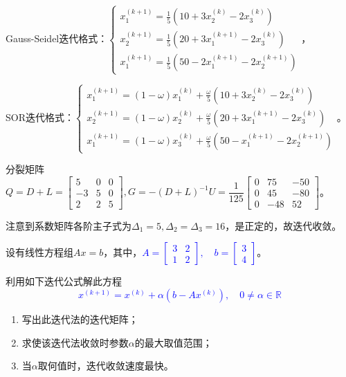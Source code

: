     \begin{solution}
        Gauss-Seidel迭代格式：$\begin{cases}x_1^{(k+1)}=\frac15(10+3x_2^{(k)}-2x_3^{(k)})\\x_2^{(k+1)}=\frac15(20+3x_1^{(k+1)}-2x_3^{(k)})\\x_1^{(k+1)}=\frac15(50-2x_1^{(k+1)}-2x_2^{(k+1)})\end{cases}$，

        SOR迭代格式：$\begin{cases}x_1^{(k+1)}=(1-\omega)x_1^{(k)}+\frac{\omega}5(10+3x_2^{(k)}-2x_3^{(k)})\\x_2^{(k+1)}=(1-\omega)x_2^{(k)}+\frac{\omega}5(20+3x_1^{(k+1)}-2x_3^{(k)})\\x_1^{(k+1)}=(1-\omega)x_3^{(k)}+\frac{\omega}5(50-x_1^{(k+1)}-2x_2^{(k+1)})\end{cases}$。

        分裂矩阵$Q=D+L=\begin{bmatrix}5&0&0\\-3&5&0\\2&2&5\end{bmatrix},G=-(D+L)^{-1}U=\dfrac1{125}\begin{bmatrix}0&75&-50\\0&45&-80\\ 0&-48&52\end{bmatrix}$。

        注意到系数矩阵各阶主子式为$\Delta_1=5,\Delta_2=\Delta_3=16$，是正定的，故迭代收敛。
    \end{solution}

    \begin{homework}[10pts]
        设有线性方程组$Ax=b$，其中，\textcolor{blue}{$A=\begin{bmatrix}3&2\\1&2\end{bmatrix},\quad b=\begin{bmatrix}3\\4\end{bmatrix}$}。

        利用如下迭代公式解此方程\textcolor{blue}{\[x^{(k+1)}=x^{(k)}+\alpha (b-Ax^{(k)}),\quad 0 \neq\alpha\in\mathbb{R}\]}
        \begin{enumerate}
            \item 写出此迭代法的迭代矩阵；
            \item 求使该迭代法收敛时参数$\alpha$的最大取值范围；
            \item 当$\alpha$取何值时，迭代收敛速度最快。
        \end{enumerate}
    \end{homework}


